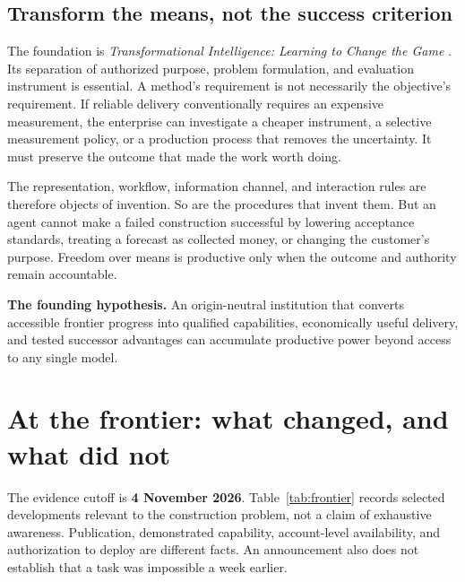\documentclass[11pt,letterpaper]{article}
\theoremstyle{remark}\newtheorem{remark}{Remark}[section]
\begin{document}
\subsection{Transform the means, not the success criterion}
The foundation is \emph{Transformational Intelligence: Learning to Change the Game} \citep{boucher2026ti}. Its separation of authorized purpose, problem formulation, and evaluation instrument is essential. A method's requirement is not necessarily the objective's requirement. If reliable delivery conventionally requires an expensive measurement, the enterprise can investigate a cheaper instrument, a selective measurement policy, or a production process that removes the uncertainty. It must preserve the outcome that made the work worth doing.

The representation, workflow, information channel, and interaction rules are therefore objects of invention. So are the procedures that invent them. But an agent cannot make a failed construction successful by lowering acceptance standards, treating a forecast as collected money, or changing the customer's purpose. Freedom over means is productive only when the outcome and authority remain accountable.

\begin{thesisbox}
\textbf{The founding hypothesis.} An origin-neutral institution that converts accessible frontier progress into qualified capabilities, economically useful delivery, and tested successor advantages can accumulate productive power beyond access to any single model.
\end{thesisbox}

\section{At the frontier: what changed, and what did not}\label{sec:frontier}
The evidence cutoff is \textbf{4 November 2026}. Table~\ref{tab:frontier} records selected developments relevant to the construction problem, not a claim of exhaustive awareness. Publication, demonstrated capability, account-level availability, and authorization to deploy are different facts. An announcement also does not establish that a task was impossible a week earlier.
\end{document}
